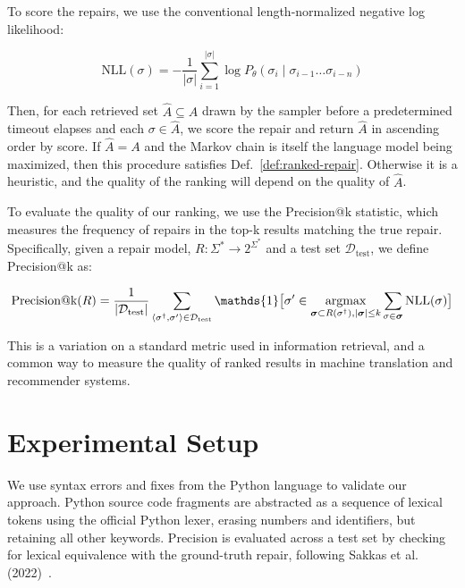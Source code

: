 \documentclass[sigplan,review,acmsmall,nonacm,anonymous]{acmart}\settopmatter{printfolios=false,printccs=false,printacmref=false}
\begin{document}
  To score the repairs, we use the conventional length-normalized negative log likelihood:

  \begin{equation}
    \text{NLL}(\sigma) = -\frac{1}{|\sigma|}\sum_{i=1}^{|\sigma|}\log P_\theta(\sigma_i \mid \sigma_{i-1}\ldots\sigma_{i-n})
  \end{equation}

  Then, for each retrieved set $\hat{A} \subseteq A$ drawn by the sampler before a predetermined timeout elapses and each $\sigma \in \hat{A}$, we score the repair and return $\hat{A}$ in ascending order by score. If $\hat{A} = A$ and the Markov chain is itself the language model being maximized, then this procedure satisfies Def.~\ref{def:ranked-repair}. Otherwise it is a heuristic, and the quality of the ranking will depend on the quality of $\hat{A}$.

  To evaluate the quality of our ranking, we use the Precision@k statistic, which measures the frequency of repairs in the top-k results matching the true repair. Specifically, given a repair model, $R: \Sigma^* \rightarrow 2^{\Sigma^*}$ and a test set $\mathcal{D}_{\text{test}}$, we define Precision@k as:

  \begin{equation}
    \text{Precision@k}(R) = \frac{1}{|\mathcal{D}_{\text{test}}|}\sum_{\langle\sigma^\dagger, \sigma'\rangle \in \mathcal{D}_{\text{test}}} \mathds{1}\big[\sigma' \in \argmax_{\bm{\sigma} \subset R(\sigma^\dagger), |\bm{\sigma}| \leq k}\sum_{\sigma \in \bm{\sigma}}\text{NLL}(\sigma)\big]
  \end{equation}

  This is a variation on a standard metric used in information retrieval, and a common way to measure the quality of ranked results in machine translation and recommender systems.

  \section{Experimental Setup}

  We use syntax errors and fixes from the Python language to validate our approach.  Python source code fragments are abstracted as a sequence of lexical tokens using the official Python lexer, erasing numbers and identifiers, but retaining all other keywords. Precision is evaluated across a test set by checking for lexical equivalence with the ground-truth repair, following Sakkas et al. (2022)~\cite{sakkas2022seq2parse}.
\end{document}
